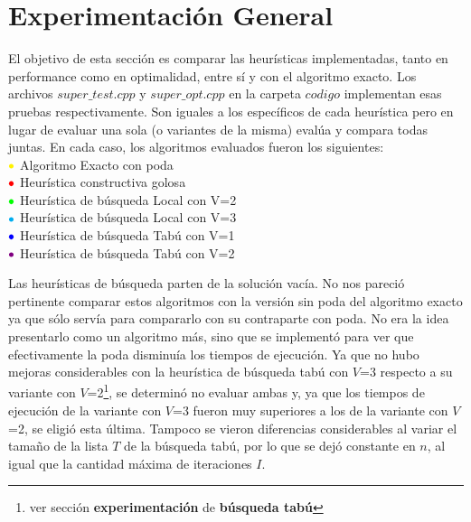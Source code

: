 \section{Experimentación General}

\par{El objetivo de esta sección es comparar las heurísticas implementadas,
tanto en performance como en optimalidad, entre sí y con el algoritmo exacto.
Los archivos $super\_test.cpp$ y $super\_opt.cpp$ en la carpeta $codigo$
implementan esas pruebas respectivamente. Son iguales a los específicos de cada
heurística pero en lugar de evaluar una sola (o variantes de la misma) evalúa
y compara todas juntas. En cada caso, los algoritmos evaluados fueron los
siguientes:}\\

${\color{yellow}\bullet}$ Algoritmo Exacto con poda\\

${\color{red}\bullet}$ Heurística constructiva golosa\\

${\color{green}\bullet}$ Heurística de búsqueda Local con V=2\\

${\color{cyan}\bullet}$ Heurística de búsqueda Local con V=3\\

${\color{blue}\bullet}$ Heurística de búsqueda Tabú con V=1\\

${\color{violet}\bullet}$ Heurística de búsqueda Tabú con V=2\\

\par{Las heurísticas de búsqueda parten de la solución vacía.
No nos pareció pertinente comparar estos algoritmos con la versión sin
poda del algoritmo exacto ya que sólo servía para compararlo con su contraparte
con poda. No era la idea presentarlo como un algoritmo más, sino que se
implementó para ver que efectivamente la poda disminuía los tiempos de
ejecución. Ya que no hubo mejoras considerables con la heurística de búsqueda
tabú con $V$=3 respecto a su variante con $V$=2\footnote{ver sección
\textbf{experimentación} de \textbf{búsqueda tabú}}, se determinó no evaluar
ambas y, ya que los tiempos de ejecución de la variante con $V$=3 fueron muy
superiores a los de la variante con $V$=2, se eligió esta última.
Tampoco se vieron diferencias considerables al variar el tamaño de la lista $T$
de la búsqueda tabú, por lo que se dejó constante en $n$, al igual que la
cantidad máxima de iteraciones $I$.}\\

